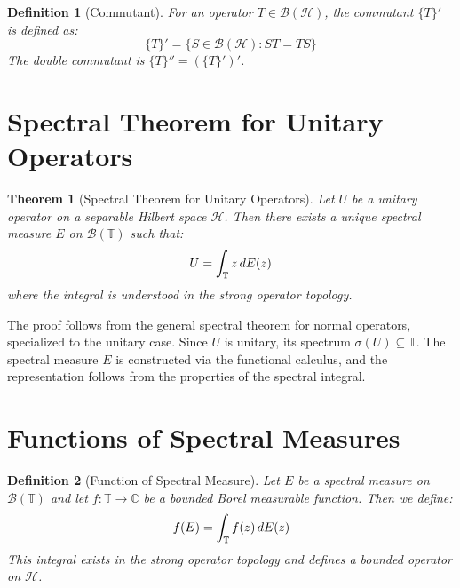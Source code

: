 \documentclass{article}
\newtheorem{definition}{Definition}
\newtheorem{theorem}{Theorem}
\begin{document}
\begin{definition}
  [Commutant] For an operator $T \in \mathcal{B} (\mathcal{H})$, the commutant
  $\{T\}'$ is defined as:
  \begin{equation}
    \{T\}' = \{S \in \mathcal{B}(\mathcal{H}) : ST = TS\}
  \end{equation}
  The double commutant is $\{T\}'' = (\{T\}')'$.
\end{definition}

\section{Spectral Theorem for Unitary Operators}

\begin{theorem}
  [Spectral Theorem for Unitary Operators] Let $U$ be a unitary operator on a
  separable Hilbert space $\mathcal{H}$. Then there exists a unique spectral
  measure $E$ on $\mathcal{B} (\mathbb{T})$ such that:
  \begin{equation}
    U = \int_{\mathbb{T}} z \hspace{0.17em} dE (z)
  \end{equation}
  where the integral is understood in the strong operator topology.
\end{theorem}

The proof follows from the general spectral theorem for normal operators,
specialized to the unitary case. Since $U$ is unitary, its spectrum $\sigma
(U) \subseteq \mathbb{T}$. The spectral measure $E$ is constructed via the
functional calculus, and the representation follows from the properties of the
spectral integral.

\section{Functions of Spectral Measures}

\begin{definition}
  [Function of Spectral Measure] Let $E$ be a spectral measure on $\mathcal{B}
  (\mathbb{T})$ and let $f : \mathbb{T} \to \mathbb{C}$ be a bounded Borel
  measurable function. Then we define:
  \begin{equation}
    f (E) = \int_{\mathbb{T}} f (z)  \hspace{0.17em} dE (z)
  \end{equation}
  This integral exists in the strong operator topology and defines a bounded
  operator on $\mathcal{H}$.
\end{definition}
\end{document}
